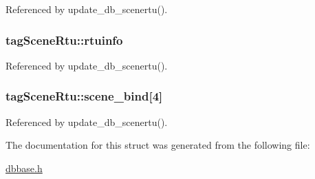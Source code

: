 Referenced by update\-\_\-db\-\_\-scenertu().

\hypertarget{structtagSceneRtu_aef53bec130f42a769962a12d7fbaaf86}{
\subsubsection[{rtuinfo}]{ tag\-Scene\-Rtu\-::rtuinfo}}\label{structtagSceneRtu_aef53bec130f42a769962a12d7fbaaf86}


Referenced by update\-\_\-db\-\_\-scenertu().

\hypertarget{structtagSceneRtu_a98ab76ad18826ddb56000b4070ae3c7d}{
\subsubsection[{scene\-\_\-bind}]{ tag\-Scene\-Rtu\-::scene\-\_\-bind\mbox{[}4\mbox{]}}}\label{structtagSceneRtu_a98ab76ad18826ddb56000b4070ae3c7d}


Referenced by update\-\_\-db\-\_\-scenertu().



The documentation for this struct was generated from the following file\-:\begin{DoxyCompactItemize}
\item 
\hyperlink{dbbase_8h}{dbbase.\-h}\end{DoxyCompactItemize}
